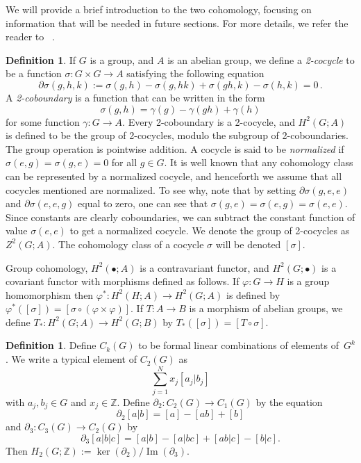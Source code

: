 \documentclass{amsart}
\theoremstyle{definition}
\newtheorem{definition}[theorem]{Definition}
\newcommand{\Z}{\mathbb{Z}}
\DeclareMathOperator{\im}{Im}
\begin{document}
We will provide a brief introduction to the two cohomology, focusing on information that will be needed in future sections. For more details, we refer the reader to ~\cite{coho}. 
\begin{definition}
If $G$ is a group, and $A$ is an abelian group, we define a {\em 2-cocycle} to be a function $\sigma \colon G\times G \to A$ satisfying the following equation
$$\partial\sigma(g,h,k):=\sigma(g,h)-\sigma(g,hk)+\sigma(gh,k)-\sigma(h,k)=0\,.$$
A {\em 2-coboundary} is a function that can be written in the form
$$\sigma(g,h)=\gamma(g)-\gamma(gh)+\gamma(h)$$
for some function $\gamma \colon G\rightarrow A$. Every 2-coboundary is a 2-cocycle, and $H^2(G;A)$ is defined to be the group of 2-cocycles, modulo the subgroup of 2-coboundaries. The group operation is pointwise addition. A cocycle is said to be {\em normalized} if $\sigma(e,g)=\sigma(g,e)=0$ for all $g\in G$. It is well known that any cohomology class can be represented by a normalized cocycle, and henceforth we assume that all cocycles mentioned are normalized. To see why, note that by setting $\partial\sigma(g,e,e)$ and $\partial\sigma(e,e,g)$ equal to zero, one can see that $\sigma(g,e)=\sigma(e,g)=\sigma(e,e)$. Since constants are clearly coboundaries, we can subtract the constant function of value $\sigma(e,e)$ to get a normalized cocycle. We denote the group of 2-cocycles as $Z^2(G;A)$. The cohomology class of a cocycle $\sigma$ will be denoted $[\sigma]$.
\end{definition}

Group cohomology, $H^2(\bullet; A)$ is a contravariant functor, and $H^2(G;\bullet)$ is a covariant functor with morphisms defined as follows. If $\varphi \colon G\rightarrow H$ is a group homomorphism then $\varphi^*:H^2(H;A)\rightarrow H^2(G;A)$ is defined by $\varphi^*([\sigma])=[\sigma\circ(\varphi\times\varphi)]$. If $T \colon A\rightarrow B$ is a morphism of abelian groups, we define $T_* \colon H^2(G;A)\rightarrow H^2(G;B)$ by $T_*([\sigma])=[T\circ\sigma]$.


\begin{definition}
Define $C_k(G)$ to be formal linear combinations of elements of~$G^k$. We write a typical element of $C_2(G)$ as
$$\sum_{j=1}^Nx_j[a_j|b_j]$$
with $a_j,b_j\in G$ and $x_j\in\Z$. Define $\partial_2 \colon C_2(G)\rightarrow C_1(G)$ by the equation
$$\partial_2[a|b]=[a]-[ab]+[b]$$
and $\partial_3\colon C_3(G)\rightarrow C_2(G)$ by
$$\partial_3[a|b|c]=[a|b]-[a|bc]+[ab|c]-[b|c].$$
Then $H_2(G;\Z):=\ker(\partial_2)/\im(\partial_3)$.
\end{definition}
\end{document}
